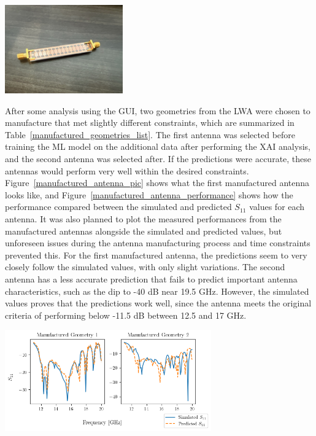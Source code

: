 \documentclass[conference]{IEEEtran}
\newenvironment{Figure}
    {\par\medskip\noindent\minipage{\linewidth}}
    {\endminipage\par\medskip}
\begin{document}
\begin{Figure}
    \centering
    \includegraphics[width=2in]{manufactured_antenna}
    \label{manufactured_antenna_pic}
\end{Figure} 

After some analysis using the GUI, two geometries from the LWA were chosen to manufacture that met slightly different constraints, which are summarized in Table~\ref{manufactured_geometries_list}. The first antenna was selected before training the ML model on the additional data after performing the XAI analysis, and the second antenna was selected after. If the predictions were accurate, these antennas would perform very well within the desired constraints. Figure~\ref{manufactured_antenna_pic} shows what the first manufactured antenna looks like, and Figure~\ref{manufactured_antenna_performance} shows how the performance compared between the simulated and predicted $S_{11}$ values for each antenna. It was also planned to plot the measured performances from the manufactured antennas alongside the simulated and predicted values, but unforeseen issues during the antenna manufacturing process and time constraints prevented this. For the first manufactured antenna, the predictions seem to very closely follow the simulated values, with only slight variations. The second antenna has a less accurate prediction that fails to predict important antenna characteristics, such as the dip to -40 dB near 19.5 GHz. However, the simulated values proves that the predictions work well, since the antenna meets the original criteria of performing below -11.5 dB between 12.5 and 17 GHz.

\begin{Figure}
    \centering
    \includegraphics[width=3.5in]{manufactured_antenna_performance}
    \label{manufactured_antenna_performance}
\end{Figure} 
\end{document}
